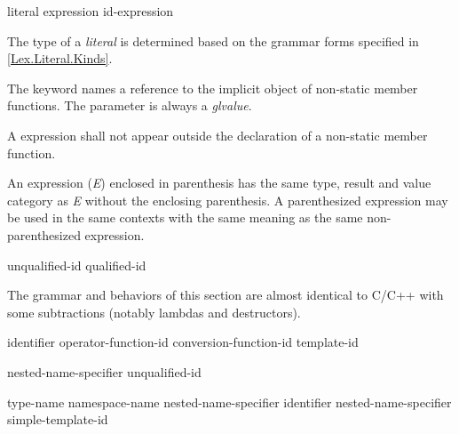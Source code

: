 
\begin{grammar}
  \br
  literal\br
  \br
  \terminal{(} expression \terminal{)}\br
  id-expression\br
\end{grammar}


\p The type of a \textit{literal} is determined based on the grammar forms
specified in \ref{Lex.Literal.Kinds}.


\p The keyword  names a reference to the implicit object of
non-static member functions. The  parameter is always a
\textit{glvalue}.

\p A  expression shall not appear outside the declaration of a
non-static member function.


\p An expression (\textit{E}) enclosed in parenthesis has the same type, result
and value category as \textit{E} without the enclosing parenthesis. A
parenthesized expression may be used in the same contexts with the same meaning
as the same non-parenthesized expression.


\begin{grammar}
  \br
  unqualified-id\br
  qualified-id
\end{grammar}

\begin{note}
  The grammar and behaviors of this section are almost identical to C/C++ with
  some subtractions (notably lambdas and destructors).
\end{note}


\begin{grammar}
  \br
  identifier\br
  operator-function-id\br
  conversion-function-id\br
  template-id\br
\end{grammar}


\begin{grammar}
  \br
  nested-name-specifier  unqualified-id\br

  \br
  \terminal{::}\br
  type-name \terminal{::}\br
  namespace-name \terminal{::}\br
  nested-name-specifier identifier \terminal{::}\br
  nested-name-specifier  simple-template-id \terminal{::}
\end{grammar}

